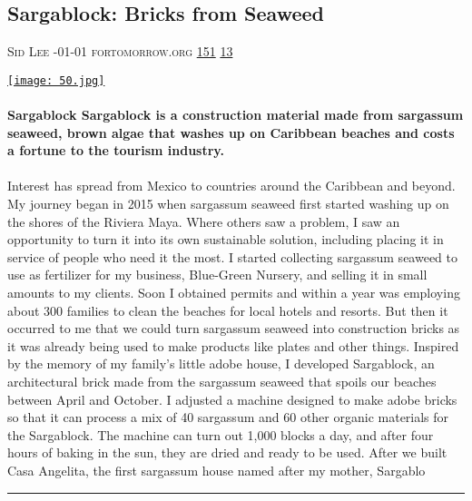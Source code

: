 \documentclass[10pt,a4paper]{article}
\begin{document}
\begin{multicols}{2}
\begin{minipage}{\linewidth}
\subsection{Sargablock: Bricks from Seaweed}
\textsc{\footnotesize
{\scriptsize\faUser}\space 
Sid Lee 
{\scriptsize\faCalendar}-01-01 
{\scriptsize\faGlobe}\space 
fortomorrow.org 
{\scriptsize\faThumbsOUp}\space 
\href{http://news.ycombinator.com/item?id=37175721\&utm\_term=comment}{151} 
{\scriptsize\faComments}\space 
\href{http://news.ycombinator.com/item?id=37175721\&utm\_term=comment}{13} 
}
\par\medskip\noindent
\href{https://fortomorrow.org/explore-solutions/sargablock?utm\_source=hackernewsletter\&utm\_medium=email\&utm\_term=learn}{
    \texttt{[image: 50.jpg]}
}
\end{minipage}
\paragraph{}
\textbf{Sargablock
Sargablock is a construction material made from sargassum seaweed, brown algae that washes up on Caribbean beaches and costs a fortune to the tourism industry.}
\paragraph{}
 Interest has spread from Mexico to countries around the Caribbean and beyond.
My journey began in 2015 when sargassum seaweed first started washing up on the shores of the Riviera Maya. Where others saw a problem, I saw an opportunity to turn it into its own sustainable solution, including placing it in service of people who need it the most.
I started collecting sargassum seaweed to use as fertilizer for my business, Blue-Green Nursery, and selling it in small amounts to my clients. Soon I obtained permits and within a year was employing about 300 families to clean the beaches for local hotels and resorts. But then it occurred to me that we could turn sargassum seaweed into construction bricks as it was already being used to make products like plates and other things. Inspired by the memory of my family’s little adobe house, I developed Sargablock, an architectural brick made from the sargassum seaweed that spoils our beaches between April and October.
I adjusted a machine designed to make adobe bricks so that it can process a mix of 40 sargassum and 60 other organic materials for the Sargablock. The machine can turn out 1,000 blocks a day, and after four hours of baking in the sun, they are dried and ready to be used. After we built Casa Angelita, the first sargassum house named after my mother, Sargablo
\par\noindent\textcolor{red}{\rule{\linewidth}{0.2mm}}
\vfill
\null
\noindent\begin{minipage}{\linewidth}

\end{minipage}
\end{multicols}
\end{document}

